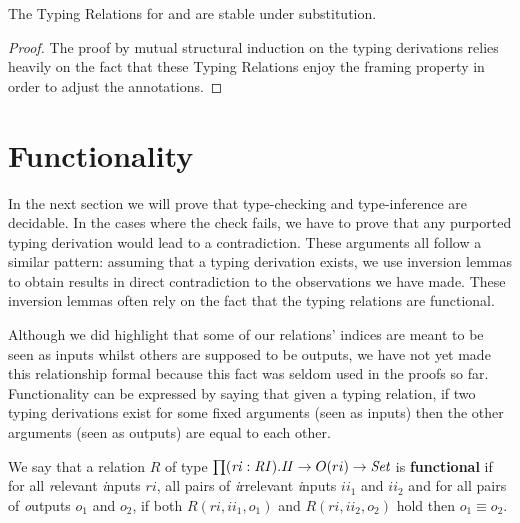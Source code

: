 \begin{theorem}\label{theorem:substituting}
The Typing Relations for \Inferable{} and \Checkable{} are stable under substitution.
\end{theorem}
\begin{proof}
The proof by mutual structural induction on the typing derivations relies
heavily on the fact that these Typing Relations enjoy the framing property
in order to adjust the \Usages{} annotations.
\end{proof}



\section{Functionality}\label{sec:functional}

In the next section we will prove that type-checking and type-inference are
decidable. In the cases where the check fails, we have to prove that any
purported typing derivation would lead to a contradiction. These arguments
all follow a similar pattern: assuming that a typing derivation exists, we
use inversion lemmas to obtain results in direct contradiction to the
observations we have made. These inversion lemmas often rely on the fact
that the typing relations are functional.

Although we did highlight that some of our relations' indices are meant
to be seen as inputs whilst others are supposed to be outputs, we have
not yet made this relationship formal because this fact was seldom used
in the proofs so far. Functionality can be expressed by saying that given
a typing relation, if two typing derivations exist for some fixed arguments
(seen as inputs) then the other arguments (seen as outputs) are equal to each
other.

\begin{definition}We say that a relation $R$ of type
\ensuremath{\prod (\mathit{ri} : \mathit{RI}). \mathit{II} \rightarrow O(ri) \rightarrow \Set{}}
is \textbf{functional} if for all \emph{r}elevant \emph{i}nputs $\mathit{ri}$, all pairs of
\emph{i}rrelevant \emph{i}nputs \ensuremath{\mathit{ii_1}} and \ensuremath{\mathit{ii_2}} and for all pairs
of \emph{o}utputs \ensuremath{o_1} and \ensuremath{o_2}, if both \ensuremath{R(\mathit{ri}, \mathit{ii_1}, o_1)}
and \ensuremath{R(\mathit{ri}, \mathit{ii_2}, o_2)} hold then \ensuremath{o_1 \equiv o_2}.
\end{definition}

